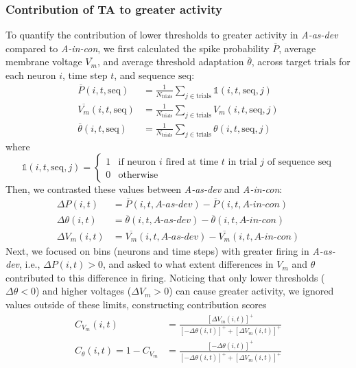 \documentclass[9pt,lineno,onehalfspacing]{elife}
\newcommand{\dev}{\textit{A-as-dev}}
\newcommand{\msc}{\textit{A-in-con}}
\begin{document}
\subsubsection{Contribution of TA to greater activity}
To quantify the contribution of lower thresholds to greater activity in \dev{} compared to \msc{}, we first calculated the spike probability $\overline P$, average membrane voltage $\overline{V_m}$, and average threshold adaptation $\overline \theta$, across target $\mathrm{trials}$ for each neuron $i$, time step $t$, and sequence $\mathrm{seq}$:
\begin{align}
    \overline{P}(i,t,\mathrm{seq}) &= \frac{1}{N_{\mathrm{trials}}} \sum_{j \in \mathrm{trials}} \mathbb{1}(i,t,\mathrm{seq},j) \nonumber \\
    \overline{V_m}(i,t,\mathrm{seq}) &= \frac{1}{N_{\mathrm{trials}}} \sum_{j \in \mathrm{trials}} V_m(i,t,\mathrm{seq},j) \label{eq:hist_raw} \\
    \overline{\theta}(i,t,\mathrm{seq}) &= \frac{1}{N_{\mathrm{trials}}} \sum_{j \in \mathrm{trials}} \theta(i,t,\mathrm{seq},j) \nonumber
\end{align}
where
\begin{equation*}
    \mathbb{1}(i,t,\mathrm{seq},j) =
    \begin{cases}
        1 & \text{if neuron $i$ fired at time $t$ in trial $j$ of sequence $\mathrm{seq}$}\\
        0 & \text{otherwise}
    \end{cases}
\end{equation*}
Then, we contrasted these values between \dev{} and \msc{}:
\begin{align}
    \Delta P(i,t) &= \overline{P}(i,t,\dev{}) - \overline{P}(i,t,\msc{}) \nonumber \\
    \Delta \theta(i,t) &= \overline{\theta}(i,t,\dev{}) - \overline{\theta}(i,t,\msc{}) \label{eq:hist_contrast} \\
    \Delta V_m(i,t) &= \overline{V_m}(i,t,\dev{}) - \overline{V_m}(i,t,\msc{}) \nonumber
\end{align}
Next, we focused on bins (neurons and time steps) with greater firing in \dev{}, i.e., $\Delta P(i,t) > 0$, and asked to what extent differences in $V_m$ and $\theta$ contributed to this difference in firing. Noticing that only lower thresholds ($\Delta \theta < 0$) and higher voltages ($\Delta V_m > 0$) can cause greater activity, we ignored values outside of these limits, constructing contribution scores
\begin{align}
    C_{V_m}(i,t) &= \frac{[\Delta V_m(i,t)]^+}{[-\Delta \theta(i,t)]^+ + [\Delta V_m(i,t)]^+} \nonumber \\
    C_\theta(i,t) = 1-C_{V_m} &= \frac{[-\Delta \theta(i,t)]^+}{[-\Delta \theta(i,t)]^+ + [\Delta V_m(i,t)]^+} \label{eq:hist_contrib}
\end{align}
\end{document}
